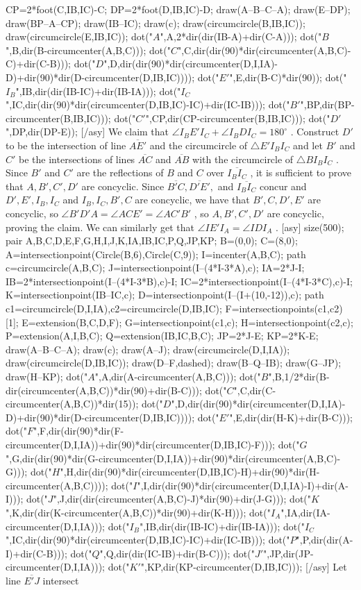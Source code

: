 \documentclass[12pt]{article}
\begin{document}
CP=2*foot(C,IB,IC)-C; DP=2*foot(D,IB,IC)-D; draw(A--B--C--A); draw(E--DP); draw(BP--A--CP); draw(IB--IC); draw(c); draw(circumcircle(B,IB,IC)); draw(circumcircle(E,IB,IC)); dot("$A$",A,2*dir(dir(IB-A)+dir(C-A))); dot("$B$",B,dir(B-circumcenter(A,B,C))); dot("$C$",C,dir(dir(90)*dir(circumcenter(A,B,C)-C)+dir(C-B))); dot("$D$",D,dir(dir(90)*dir(circumcenter(D,I,IA)-D)+dir(90)*dir(D-circumcenter(D,IB,IC)))); dot("$E'$",E,dir(B-C)*dir(90)); dot("$I_B$",IB,dir(dir(IB-IC)+dir(IB-IA))); dot("$I_C$",IC,dir(dir(90)*dir(circumcenter(D,IB,IC)-IC)+dir(IC-IB))); dot("$B'$",BP,dir(BP-circumcenter(B,IB,IC))); dot("$C'$",CP,dir(CP-circumcenter(B,IB,IC))); dot("$D'$",DP,dir(DP-E)); [/asy] We claim that $\angle{}I_BE'I_C+\angle{}I_BDI_C=180^\circ$ . Construct $D'$ to be the intersection of line $\overline{AE'}$ and the circumcircle of $\triangle{}E'I_BI_C$ and let $B'$ and $C'$ be the intersections of lines $\overline{AC}$ and $\overline{AB}$ with the circumcircle of $\triangle{}BI_BI_C$ . Since $B'$ and $C'$ are the reflections of $B$ and $C$ over $\overline{I_BI_C}$ , it is sufficient to prove that $A,B',C',D'$ are concyclic. Since $\overline{B'C},\overline{D'E'},$ and $\overline{I_BI_C}$ concur and $D',E',I_B,I_C$ and $I_B,I_C,B',C$ are concyclic, we have that $B',C,D',E'$ are concyclic, so $\angle{}B'D'A=\angle{}ACE'=\angle{}AC'B'$ , so $A,B',C',D'$ are concyclic, proving the claim. We can similarly get that $\angle{}IE'I_A=\angle{}IDI_A$ . [asy] size(500); pair A,B,C,D,E,F,G,H,I,J,K,IA,IB,IC,P,Q,JP,KP; B=(0,0); C=(8,0); A=intersectionpoint(Circle(B,6),Circle(C,9)); I=incenter(A,B,C); path c=circumcircle(A,B,C); J=intersectionpoint(I--(4*I-3*A),c); IA=2*J-I; IB=2*intersectionpoint(I--(4*I-3*B),c)-I; IC=2*intersectionpoint(I--(4*I-3*C),c)-I; K=intersectionpoint(IB--IC,c); D=intersectionpoint(I--(I+(10,-12)),c); path c1=circumcircle(D,I,IA),c2=circumcircle(D,IB,IC); F=intersectionpoints(c1,c2)[1]; E=extension(B,C,D,F); G=intersectionpoint(c1,c); H=intersectionpoint(c2,c); P=extension(A,I,B,C); Q=extension(IB,IC,B,C); JP=2*J-E; KP=2*K-E; draw(A--B--C--A); draw(c); draw(A--J); draw(circumcircle(D,I,IA)); draw(circumcircle(D,IB,IC)); draw(D--F,dashed); draw(B--Q--IB); draw(G--JP); draw(H--KP); dot("$A$",A,dir(A-circumcenter(A,B,C))); dot("$B$",B,1/2*dir(B-dir(circumcenter(A,B,C))*dir(90)+dir(B-C))); dot("$C$",C,dir(C-circumcenter(A,B,C))*dir(15)); dot("$D$",D,dir(dir(90)*dir(circumcenter(D,I,IA)-D)+dir(90)*dir(D-circumcenter(D,IB,IC)))); dot("$E'$",E,dir(dir(H-K)+dir(B-C))); dot("$F$",F,dir(dir(90)*dir(F-circumcenter(D,I,IA))+dir(90)*dir(circumcenter(D,IB,IC)-F))); dot("$G$",G,dir(dir(90)*dir(G-circumcenter(D,I,IA))+dir(90)*dir(circumcenter(A,B,C)-G))); dot("$H$",H,dir(dir(90)*dir(circumcenter(D,IB,IC)-H)+dir(90)*dir(H-circumcenter(A,B,C)))); dot("$I$",I,dir(dir(90)*dir(circumcenter(D,I,IA)-I)+dir(A-I))); dot("$J$",J,dir(dir(circumcenter(A,B,C)-J)*dir(90)+dir(J-G))); dot("$K$",K,dir(dir(K-circumcenter(A,B,C))*dir(90)+dir(K-H))); dot("$I_A$",IA,dir(IA-circumcenter(D,I,IA))); dot("$I_B$",IB,dir(dir(IB-IC)+dir(IB-IA))); dot("$I_C$",IC,dir(dir(90)*dir(circumcenter(D,IB,IC)-IC)+dir(IC-IB))); dot("$P$",P,dir(dir(A-I)+dir(C-B))); dot("$Q$",Q,dir(dir(IC-IB)+dir(B-C))); dot("$J'$",JP,dir(JP-circumcenter(D,I,IA))); dot("$K'$",KP,dir(KP-circumcenter(D,IB,IC))); [/asy] Let line $\overline{E'J}$ intersect 
\end{document}
